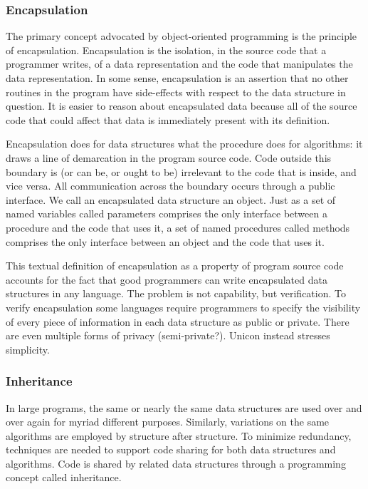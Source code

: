 \subsubsection{Encapsulation}

The primary concept advocated by object-oriented programming is the
principle of encapsulation. Encapsulation is the
isolation, in the source code that a programmer writes, of a data
representation and the code that manipulates the data representation.
In some sense, encapsulation is an assertion that no other routines in
the program have {\textquotedbl}side-effects{\textquotedbl} with
respect to the data structure in question. It is easier to reason about
encapsulated data because all of the source code that could affect that
data is immediately present with its definition. 

Encapsulation does for data structures what the procedure does for
algorithms: it draws a line of demarcation in the program source code.
Code outside this boundary is (or can be, or ought to be) irrelevant to
the code that is inside, and vice versa. All communication across the
boundary occurs through a public interface. We call an encapsulated
data structure an object. Just as a set of named variables called
parameters comprises the only interface between a procedure and the
code that uses it, a set of named procedures called methods comprises
the only interface between an object and the code that uses it. 

This textual definition of encapsulation as a property of program source
code accounts for the fact that good programmers can write encapsulated
data structures in any language. The problem is not capability, but
verification. To verify encapsulation some languages require
programmers to specify the visibility of every piece of information in
each data structure as {\textquotedbl}public{\textquotedbl} or
{\textquotedbl}private.{\textquotedbl} There are even multiple forms of
privacy (semi-private?). Unicon instead stresses simplicity. 

\subsubsection{Inheritance}

In large programs, the same or nearly the same data structures are used
over and over again for myriad different purposes. Similarly,
variations on the same algorithms are employed by structure after
structure. To minimize redundancy, techniques are needed to support
code sharing for both data structures and algorithms. Code is shared by
related data structures through a programming concept called
inheritance. 

